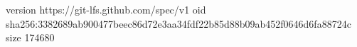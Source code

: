 version https://git-lfs.github.com/spec/v1
oid sha256:3382689ab900477beec86d72e3aa34fdf22b85d88b09ab452f0646d6fa88724c
size 174680
